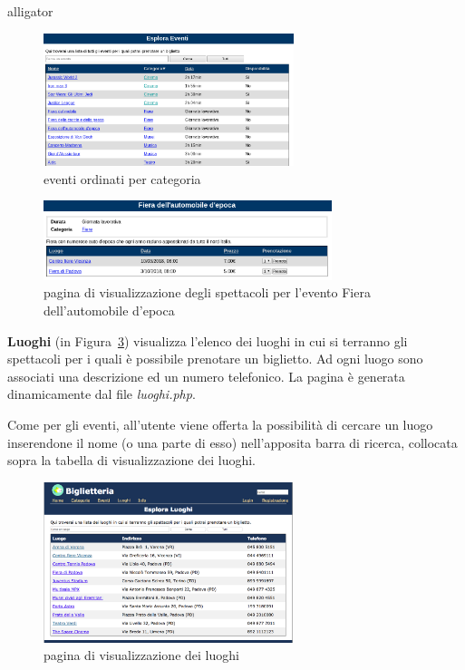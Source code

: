 \documentclass[10pt, a4paper]{article}
\begin{document}
\begin{labeling}{alligator}
\begin{figure}[h!]
  \centering
  \includegraphics[width=0.65\textwidth]{Images/eventi_ordinati_tab.png}
  \caption{eventi ordinati per categoria}
  \label{fig:eventi_ordinati_tab}
\end{figure}

\begin{figure}[h!]
	\centering
	\includegraphics[width=0.75\textwidth]{Images/evento_luogo.png}
	\caption{pagina di visualizzazione degli spettacoli per l'evento Fiera dell'automobile d'epoca}
	\label{fig:evento_luogo.png}
\end{figure}

\item[\textbf{\textcolor{UniPD}{Luoghi}}] (in Figura~\ref{fig:luoghi})
visualizza l'elenco dei luoghi in cui si terranno 
gli spettacoli per i quali è possibile prenotare un biglietto.
Ad ogni luogo sono associati una descrizione ed un numero telefonico.
La pagina è generata dinamicamente dal file \emph{luoghi.php}.

Come per gli eventi, all'utente viene offerta la possibilità di cercare un luogo
inserendone il nome (o una parte di esso) nell'apposita barra di ricerca, collocata sopra
la tabella di visualizzazione dei luoghi.
\begin{figure}[h!]
  \centering
  \includegraphics[width=0.65\textwidth]{Images/luoghi.png}
  \caption{pagina di visualizzazione dei luoghi}
  \label{fig:luoghi}
\end{figure}



\end{labeling}
\end{document}

